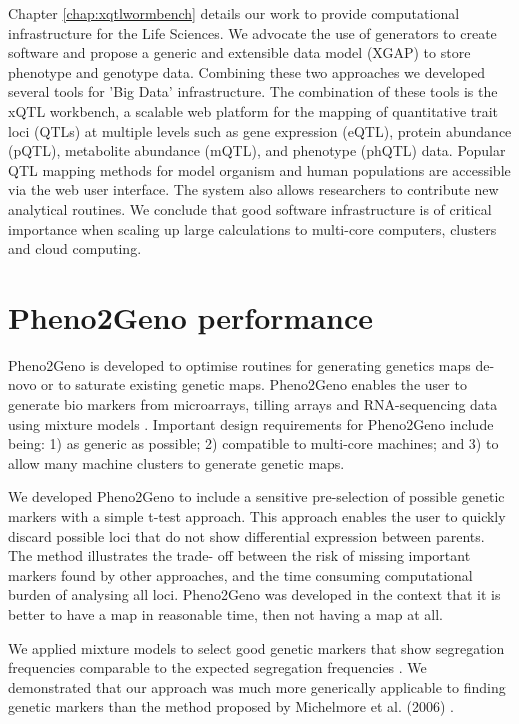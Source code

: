 Chapter \ref{chap:xqtlwormbench} details our work to provide computational infrastructure for the Life Sciences. We advocate the use of generators to 
create software and propose a generic and extensible data model (XGAP) \cite{Swertz:2010a} to store phenotype and genotype data. Combining these 
two approaches we developed several tools for 'Big Data' infrastructure. The combination of these tools is the xQTL workbench, 
a scalable web platform for the mapping of quantitative trait loci (QTLs) at multiple levels such as gene expression (eQTL), 
protein abundance (pQTL), metabolite abundance (mQTL), and phenotype (phQTL) data. Popular QTL mapping methods for model organism 
and human populations are accessible via the web user interface. The system also allows researchers to contribute new analytical 
routines. We conclude that good software infrastructure is of critical importance when scaling up large calculations to multi-core 
computers, clusters and cloud computing.

\section{Pheno2Geno performance}

Pheno2Geno is developed to optimise routines for generating genetics maps de-novo or to saturate existing genetic maps. Pheno2Geno enables 
the user to generate bio markers from microarrays, tilling arrays and RNA-sequencing data using mixture models \cite{Gort:2010}. Important design 
requirements for Pheno2Geno include being: 1) as generic as possible; 2) compatible to multi-core machines; and 3) to allow many machine 
clusters to generate genetic maps.

We developed Pheno2Geno to include a sensitive pre-selection of possible genetic markers with a simple t-test approach. This approach enables 
the user to quickly discard possible loci that do not show differential expression between parents. The method illustrates the trade-
off between the risk of missing important markers found by other approaches, and the time consuming computational burden of analysing 
all loci. Pheno2Geno was developed in the context that it is better to have a map in reasonable time, then not having a map at all.

We applied mixture models to select good genetic markers that show segregation frequencies comparable to the expected segregation 
frequencies \cite{West:2006, Truco:2013}. We demonstrated that our approach was much more generically applicable to finding genetic markers than the method 
proposed by Michelmore et al. (2006) \cite{West:2006}.

